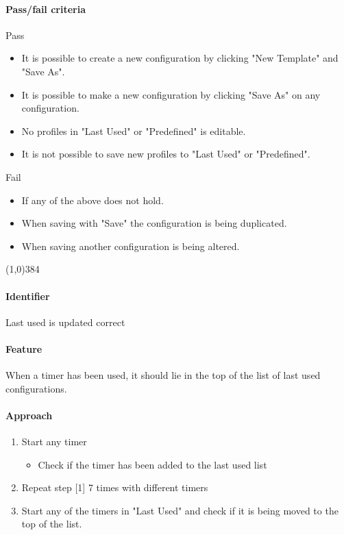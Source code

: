 \paragraph{Pass/fail criteria}
	Pass
	\begin{itemize}
		\item It is possible to create a new configuration by clicking "New Template" and "Save As".
		\item It is possible to make a new configuration by clicking "Save As" on any configuration.
		\item No profiles in "Last Used" or "Predefined" is editable.
		\item It is not possible to save new profiles to "Last Used" or "Predefined".
	\end{itemize}
	Fail
	\begin{itemize}
		\item If any of the above does not hold.
		\item When saving with "Save" the configuration is being duplicated.
		\item When saving another configuration is being altered.
	\end{itemize}

\pagebreak
\begin{center}
	\line(1,0){384}
\end{center}
\paragraph{Identifier}
	Last used is updated correct
\paragraph{Feature}
	When a timer has been used, it should lie in the top of the list of last used configurations. 
\paragraph{Approach}
	\begin{enumerate} 
		\item Start any timer
			\begin{itemize}
				\item Check if the timer has been added to the last used list
			\end{itemize}
		\item Repeat step [1] 7 times with different timers
		\item Start any of the timers in "Last Used" and check if it is being moved to the top of the list.
	\end{enumerate}
